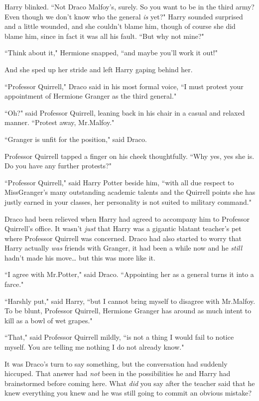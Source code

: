 Harry blinked. ``Not Draco Malfoy's, surely. So you want to be in the third army? Even though we don't know who the general \emph{is} yet?" Harry sounded surprised and a little wounded, and she couldn't blame him, though of course she did blame him, since in fact it was all his fault. ``But why not mine?"

``Think about it," Hermione snapped, ``and maybe you'll work it out!"

And she sped up her stride and left Harry gaping behind her.

\later

``Professor Quirrell," Draco said in his most formal voice, ``I must protest your appointment of Hermione Granger as the third general."

``Oh?" said Professor Quirrell, leaning back in his chair in a casual and relaxed manner. ``Protest away, Mr.\?Malfoy."

``Granger is unfit for the position," said Draco.

Professor Quirrell tapped a finger on his cheek thoughtfully. ``Why yes, yes she is. Do you have any further protests?"

``Professor Quirrell," said Harry Potter beside him, ``with all due respect to Miss\?Granger's many outstanding academic talents and the Quirrell points she has justly earned in your classes, her personality is not suited to military command."

Draco had been relieved when Harry had agreed to accompany him to Professor Quirrell's office. It wasn't \emph{just} that Harry was a gigantic blatant teacher's pet where Professor Quirrell was concerned. Draco had also started to worry that Harry actually \emph{was} friends with Granger, it had been a while now and he \emph{still} hadn't made his move{\ldots} but this was more like it.

``I agree with Mr.\?Potter," said Draco. ``Appointing her as a general turns it into a farce."

``Harshly put," said Harry, ``but I cannot bring myself to disagree with Mr.\?Malfoy. To be blunt, Professor Quirrell, Hermione Granger has around as much intent to kill as a bowl of wet grapes."

``That," said Professor Quirrell mildly, ``is not a thing I would fail to notice myself. You are telling me nothing I do not already know."

It was Draco's turn to say something, but the conversation had suddenly hiccuped. That answer had \emph{not} been in the possibilities he and Harry had brainstormed before coming here. What \emph{did} you say after the teacher said that he knew everything you knew and he was still going to commit an obvious mistake?

